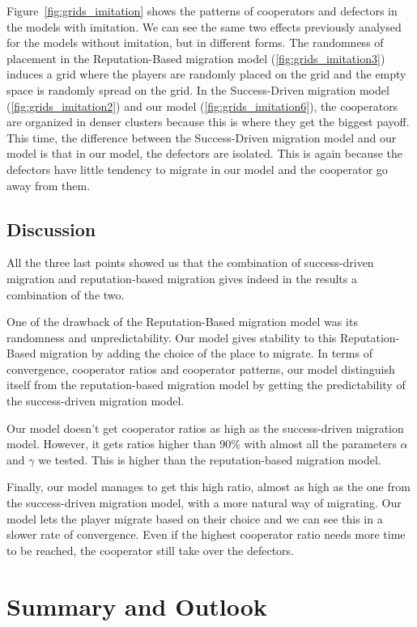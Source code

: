 \documentclass[11pt]{article}
\begin{document}
Figure~\ref{fig:grids_imitation} shows the patterns of cooperators and defectors in the models with imitation. We can see the same two effects previously analysed for the models without imitation, but in different forms.
The randomness of placement in the Reputation-Based migration model (\ref{fig:grids_imitation3}) induces a grid where the players are randomly placed on the grid and the empty space is randomly spread on the grid. In the Success-Driven migration model (\ref{fig:grids_imitation2}) and our model (\ref{fig:grids_imitation6}), the cooperators are organized in denser clusters because this is where they get the biggest payoff.
This time, the difference between the Success-Driven migration model and our model is that in our model, the defectors are isolated. This is again because the defectors have little tendency to migrate in our model and the cooperator go away from them.

\subsection{Discussion}

All the three last points showed us that the combination of success-driven migration and reputation-based migration gives indeed in the results a combination of the two.

One of the drawback of the Reputation-Based migration model was its randomness and unpredictability. Our model gives stability to this Reputation-Based migration by adding the choice of the place to migrate. In terms of convergence, cooperator ratios and cooperator patterns, our model distinguish itself from the reputation-based migration model by getting the predictability of the success-driven migration model.

Our model doesn't get cooperator ratios as high as the success-driven migration model. However, it gets ratios higher than 90\% with almost all the parameters $\alpha$ and $\gamma$ we tested. This is higher than the reputation-based migration model.

Finally, our model manages to get this high ratio, almost as high as the one from the success-driven migration model, with a more natural way of migrating. Our model lets the player migrate based on their choice and we can see this in a slower rate of convergence. Even if the highest cooperator ratio needs more time to be reached, the cooperator still take over the defectors.


\section{Summary and Outlook}
\end{document}
